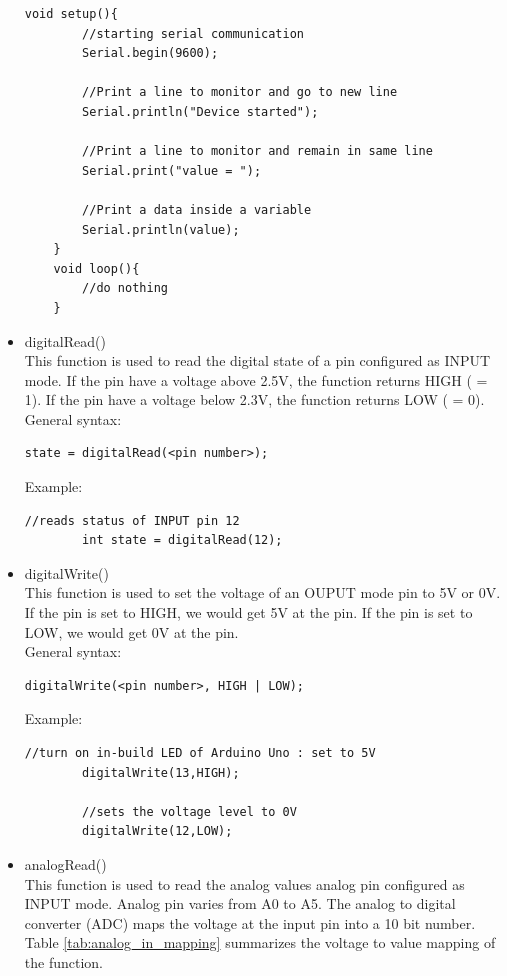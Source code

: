 \begin{itemize}
\begin{lstlisting}[style=CStyle]
    void setup(){
        //starting serial communication
        Serial.begin(9600);
            
        //Print a line to monitor and go to new line
        Serial.println("Device started");
        
        //Print a line to monitor and remain in same line
        Serial.print("value = ");

        //Print a data inside a variable
        Serial.println(value);
    }
    void loop(){
        //do nothing
    }
    \end{lstlisting}
    
    \item digitalRead() \\
    This function is used to read the digital state of a pin configured as INPUT mode. If the pin have a voltage above 2.5V, the function returns HIGH ( = 1). If the pin have a voltage below 2.3V, the function returns LOW ( = 0).\\
    General syntax:
    \begin{lstlisting}[style=CStyle]
        state = digitalRead(<pin number>);
    \end{lstlisting}
    Example:
    \begin{lstlisting}[style=CStyle]
        //reads status of INPUT pin 12
        int state = digitalRead(12);  
    \end{lstlisting}
    
    \item digitalWrite()\\
    This function is used to set the voltage of an OUPUT mode pin to 5V or 0V. If the pin is set to HIGH, we would get 5V at the pin. If the pin is set to LOW, we would get 0V at the pin.\\
    General syntax:
    \begin{lstlisting}[style=CStyle]
        digitalWrite(<pin number>, HIGH | LOW);
    \end{lstlisting}
    Example:
    \begin{lstlisting}[style=CStyle]
        //turn on in-build LED of Arduino Uno : set to 5V
        digitalWrite(13,HIGH);
        
        //sets the voltage level to 0V
        digitalWrite(12,LOW);     
    \end{lstlisting}
    
    \item analogRead()\\
    This function is used to read the analog values analog pin configured as INPUT mode. Analog pin varies from A0 to A5. The analog to digital converter (ADC) maps the voltage at the input pin into a 10 bit number. Table \ref{tab:analog_in_mapping} summarizes the voltage to value mapping of the function.
    

\end{itemize}

